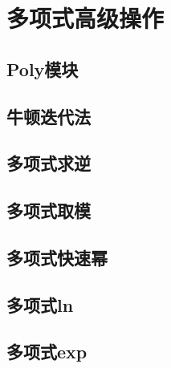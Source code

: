 \section{多项式高级操作}
\subsection{Poly模块}
\subsection{牛顿迭代法}
\subsection{多项式求逆}
\subsection{多项式取模}
\subsection{多项式快速幂}
\subsection{多项式ln}
\subsection{多项式exp}
